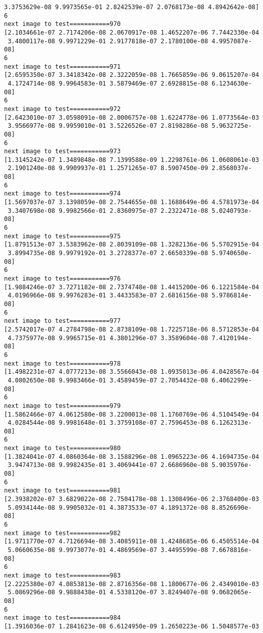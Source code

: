 \documentclass[11pt]{article}
\begin{document}
\begin{Verbatim}[commandchars=\\\{\}]
 3.3753629e-08 9.9973565e-01 2.8242539e-07 2.0768173e-08 4.8942642e-08]
6
next image to test===========970
[2.1034661e-07 2.7174206e-08 2.0670917e-08 1.4652207e-06 7.7442330e-04
 3.4800117e-08 9.9971229e-01 2.9177818e-07 2.1780100e-08 4.9957087e-08]
6
next image to test===========971
[2.6595350e-07 3.3418342e-08 2.3222059e-08 1.7665859e-06 9.0615207e-04
 4.1724714e-08 9.9964583e-01 3.5879469e-07 2.6928815e-08 6.1234630e-08]
6
next image to test===========972
[2.6423010e-07 3.0598091e-08 2.0006757e-08 1.6224778e-06 1.0773564e-03
 3.9566977e-08 9.9959010e-01 3.5226526e-07 2.8198286e-08 5.9632725e-08]
6
next image to test===========973
[1.3145242e-07 1.3489848e-08 7.1399588e-09 1.2298761e-06 1.0608061e-03
 2.1901240e-08 9.9909937e-01 1.2571265e-07 8.5907450e-09 2.8568037e-08]
6
next image to test===========974
[1.5697037e-07 3.1398059e-08 2.7544655e-08 1.1688649e-06 4.5781973e-04
 3.3407698e-08 9.9982566e-01 2.8360975e-07 2.2322471e-08 5.0240793e-08]
6
next image to test===========975
[1.8791513e-07 3.5383962e-08 2.8039109e-08 1.3282136e-06 5.5702915e-04
 3.8994735e-08 9.9979192e-01 3.2728377e-07 2.6650339e-08 5.9740650e-08]
6
next image to test===========976
[1.9884246e-07 3.7271182e-08 2.7374748e-08 1.4415200e-06 6.1221584e-04
 4.0196966e-08 9.9976283e-01 3.4433583e-07 2.6816156e-08 5.9786814e-08]
6
next image to test===========977
[2.5742017e-07 4.2784798e-08 2.8738109e-08 1.7225718e-06 8.5712853e-04
 4.7375977e-08 9.9965715e-01 4.3801296e-07 3.3589604e-08 7.4120194e-08]
6
next image to test===========978
[1.4982231e-07 4.0777213e-08 3.5566043e-08 1.0935013e-06 4.0428567e-04
 4.0802650e-08 9.9983466e-01 3.4589459e-07 2.7054432e-08 6.4062299e-08]
6
next image to test===========979
[1.5862466e-07 4.0612580e-08 3.2200013e-08 1.1760769e-06 4.5104549e-04
 4.0284544e-08 9.9981648e-01 3.3759108e-07 2.7596453e-08 6.1262313e-08]
6
next image to test===========980
[1.3824041e-07 4.0860364e-08 3.1588296e-08 1.0965223e-06 4.1694735e-04
 3.9474713e-08 9.9982435e-01 3.4069441e-07 2.6686960e-08 5.9035976e-08]
6
next image to test===========981
[2.3938202e-07 3.6829022e-08 2.7504178e-08 1.1308496e-06 2.3768400e-03
 5.0934144e-08 9.9905032e-01 4.3873533e-07 4.1891372e-08 8.8526690e-08]
6
next image to test===========982
[1.9711770e-07 4.7126694e-08 3.4085911e-08 1.4248685e-06 6.4505514e-04
 5.0660635e-08 9.9973077e-01 4.4869569e-07 3.4495599e-08 7.6678816e-08]
6
next image to test===========983
[2.2225380e-07 4.0853813e-08 2.8716356e-08 1.1800677e-06 2.4349010e-03
 5.0869296e-08 9.9888438e-01 4.5338120e-07 3.8249407e-08 9.0682065e-08]
6
next image to test===========984
[1.3916036e-07 1.2841623e-08 6.6124950e-09 1.2650223e-06 1.5048577e-03

\end{Verbatim}
\end{document}
